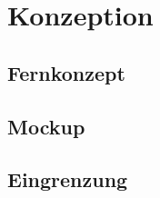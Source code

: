 \chapter{Konzeption}
\label{cha:konzeption}

\section{Fernkonzept}

\section{Mockup}

\section{Eingrenzung}